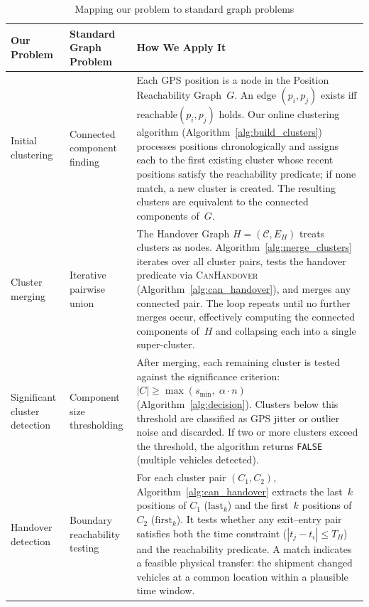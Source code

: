 \begin{table}[h]
\centering
\caption{Mapping our problem to standard graph problems}
\label{tab:graph_mapping}
\begin{tabular}{|p{28mm}|p{30mm}|p{68mm}|}
\hline
\textbf{Our Problem} & \textbf{Standard Graph Problem} & \textbf{How We Apply It} \\
\hline
Initial clustering &
Connected component finding &
Each GPS position is a node in the Position Reachability Graph~$G$. An edge $(p_i, p_j)$ exists iff $\mathrm{reachable}(p_i, p_j)$ holds. Our online clustering algorithm (Algorithm~\ref{alg:build_clusters}) processes positions chronologically and assigns each to the first existing cluster whose recent positions satisfy the reachability predicate; if none match, a new cluster is created. The resulting clusters are equivalent to the connected components of~$G$. \\
\hline
Cluster merging &
Iterative pairwise union &
The Handover Graph $H = (\mathcal{C}, E_H)$ treats clusters as nodes. Algorithm~\ref{alg:merge_clusters} iterates over all cluster pairs, tests the handover predicate via \textsc{CanHandover} (Algorithm~\ref{alg:can_handover}), and merges any connected pair. The loop repeats until no further merges occur, effectively computing the connected components of~$H$ and collapsing each into a single super-cluster. \\
\hline
Significant cluster detection &
Component size thresholding &
After merging, each remaining cluster is tested against the significance criterion: $|C| \geq \max(s_{\min},\; \alpha \cdot n)$ (Algorithm~\ref{alg:decision}). Clusters below this threshold are classified as GPS jitter or outlier noise and discarded. If two or more clusters exceed the threshold, the algorithm returns \texttt{FALSE} (multiple vehicles detected). \\
\hline
Handover detection &
Boundary reachability testing &
For each cluster pair $(C_1, C_2)$, Algorithm~\ref{alg:can_handover} extracts the last~$k$ positions of $C_1$ ($\mathrm{last}_k$) and the first~$k$ positions of $C_2$ ($\mathrm{first}_k$). It tests whether any exit--entry pair satisfies both the time constraint ($|t_j - t_i| \leq T_H$) and the reachability predicate. A match indicates a feasible physical transfer: the shipment changed vehicles at a common location within a plausible time window. \\
\hline
\end{tabular}
\end{table}

